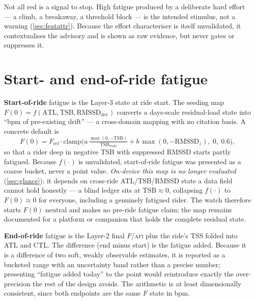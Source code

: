 \documentclass[11pt]{article}
\newcommand{\afi}{\textup{\textsc{afi}}}
\newcommand{\Fstate}{\ensuremath{F}}
\begin{document}
Not all red is a signal to stop. High fatigue produced by a deliberate hard effort --- a climb, a breakaway, a threshold block --- is the intended stimulus, not a warning (\autoref{sec:featattr}). Because the effort characteriser is itself unvalidated, it contextualises the advisory and is shown as raw evidence, but never gates or suppresses it.

\section{Start- and end-of-ride fatigue}\label{sec:startend}

\textbf{Start-of-ride} fatigue is the Layer-3 state at ride start. The seeding map $\Fstate(0)=f(\text{ATL},\text{TSB},\text{RMSSD}_{\text{dev}})$ converts a days-scale residual-load state into ``bpm of pre-existing drift'' --- a cross-domain mapping with no citation basis. A concrete default is
\begin{equation}
\Fstate(0) = F_{\text{ref}}\cdot\mathrm{clamp}\!\Big(a\,\tfrac{\max(0,-\text{TSB})}{\text{TSB}_{\text{scale}}} + b\,\max(0,-\text{RMSSD}_z),\;0,\;0.6\Big),
\label{eq:seed}
\end{equation}
so that a rider deep in negative TSB with suppressed RMSSD starts partly fatigued. Because $f(\cdot)$ is unvalidated, start-of-ride fatigue was presented as a coarse bucket, never a point value. \emph{On-device this map is no longer evaluated} (\autoref{sec:glance}): it depends on cross-ride ATL/TSB/RMSSD state a data field cannot hold honestly --- a blind ledger sits at $\text{TSB}\approx0$, collapsing $f(\cdot)$ to $\Fstate(0)\approx0$ for everyone, including a genuinely fatigued rider. The watch therefore starts $\Fstate(0)$ neutral and makes no pre-ride fatigue claim; the map remains documented for a platform or companion that holds the complete residual state.

\textbf{End-of-ride} fatigue is the Layer-2 final $\Fstate$/\afi{} plus the ride's TSS folded into ATL and CTL. The difference (end minus start) is the fatigue added. Because it is a difference of two soft, weakly observable estimates, it is reported as a bucketed range with an uncertainty band rather than a precise number; presenting ``fatigue added today'' to the point would reintroduce exactly the over-precision the rest of the design avoids. The arithmetic is at least dimensionally consistent, since both endpoints are the same $\Fstate$ state in bpm.
\end{document}
